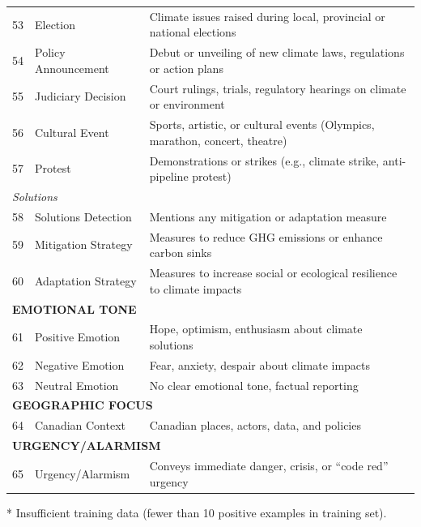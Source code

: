 {\begin{longtable}{p{0.5cm}p{5cm}p{16cm}}
53 & Election & Climate issues raised during local, provincial or national elections \\
54 & Policy Announcement & Debut or unveiling of new climate laws, regulations or action plans \\
55 & Judiciary Decision & Court rulings, trials, regulatory hearings on climate or environment \\
56 & Cultural Event & Sports, artistic, or cultural events (Olympics, marathon, concert, theatre) \\
57 & Protest & Demonstrations or strikes (e.g., climate strike, anti-pipeline protest) \\
\midrule
\multicolumn{3}{l}{\textit{Solutions}} \\
58 & Solutions Detection & Mentions any mitigation or adaptation measure \\
59 & Mitigation Strategy & Measures to reduce GHG emissions or enhance carbon sinks \\
60 & Adaptation Strategy & Measures to increase social or ecological resilience to climate impacts \\
\midrule
\multicolumn{3}{l}{\cellcolor{gray!10}\textbf{EMOTIONAL TONE}} \\
61 & Positive Emotion & Hope, optimism, enthusiasm about climate solutions \\
62 & Negative Emotion & Fear, anxiety, despair about climate impacts \\
63 & Neutral Emotion & No clear emotional tone, factual reporting \\
\midrule
\multicolumn{3}{l}{\cellcolor{gray!10}\textbf{GEOGRAPHIC FOCUS}} \\
64 & Canadian Context & Canadian places, actors, data, and policies \\
\midrule
\multicolumn{3}{l}{\cellcolor{gray!10}\textbf{URGENCY/ALARMISM}} \\
65 & Urgency/Alarmism & Conveys immediate danger, crisis, or ``code red'' urgency \\
\bottomrule
\end{longtable}
\vspace{0.5em}
\noindent\footnotesize
* Insufficient training data (fewer than 10 positive examples in training set).
} %
